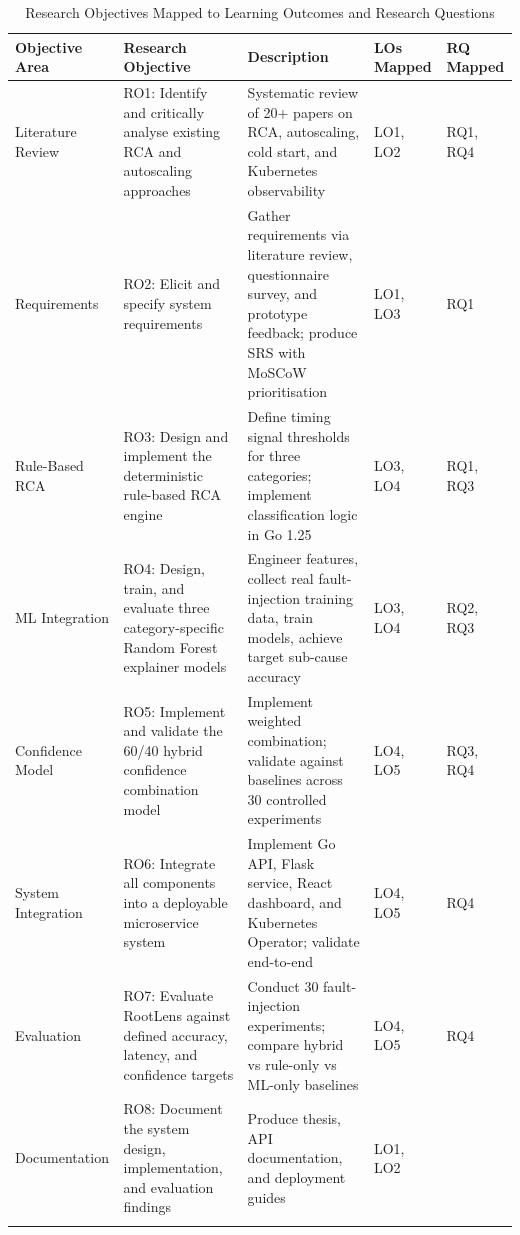 \begin{xltabular}{\textwidth}{|p{2.5cm}|p{3.5cm}|X|p{1.8cm}|p{1.5cm}|}

\hline
\textbf{Objective Area} & \textbf{Research Objective} & \textbf{Description} & \textbf{LOs Mapped} & \textbf{RQ Mapped} \\ \hline
\endhead
Literature Review & RO1: Identify and critically analyse existing RCA and autoscaling approaches & Systematic review of 20+ papers on RCA, autoscaling, cold start, and Kubernetes observability & LO1, LO2 & RQ1, RQ4 \\ \hline
Requirements & RO2: Elicit and specify system requirements & Gather requirements via literature review, questionnaire survey, and prototype feedback; produce SRS with MoSCoW prioritisation & LO1, LO3 & RQ1 \\ \hline
Rule-Based RCA & RO3: Design and implement the deterministic rule-based RCA engine & Define timing signal thresholds for three categories; implement classification logic in Go 1.25 & LO3, LO4 & RQ1, RQ3 \\ \hline
ML Integration & RO4: Design, train, and evaluate three category-specific Random Forest explainer models & Engineer features, collect real fault-injection training data, train models, achieve target sub-cause accuracy & LO3, LO4 & RQ2, RQ3 \\ \hline
Confidence Model & RO5: Implement and validate the 60/40 hybrid confidence combination model & Implement weighted combination; validate against baselines across 30 controlled experiments & LO4, LO5 & RQ3, RQ4 \\ \hline
System Integration & RO6: Integrate all components into a deployable microservice system & Implement Go API, Flask service, React dashboard, and Kubernetes Operator; validate end-to-end & LO4, LO5 & RQ4 \\ \hline
Evaluation & RO7: Evaluate RootLens against defined accuracy, latency, and confidence targets & Conduct 30 fault-injection experiments; compare hybrid vs rule-only vs ML-only baselines & LO4, LO5 & RQ4 \\ \hline
Documentation & RO8: Document the system design, implementation, and evaluation findings & Produce thesis, API documentation, and deployment guides & LO1, LO2 & \\ \hline

\caption{Research Objectives Mapped to Learning Outcomes and Research Questions}
\label{tab:research_objectives}
\end{xltabular}


